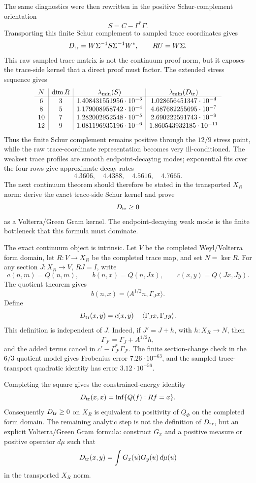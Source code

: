 \documentclass[11pt]{article}
\begin{document}
The same diagnostics were then rewritten in the positive Schur-complement
orientation
\[
  S=C-\Gamma^\ast\Gamma .
\]
Transporting this finite Schur complement to sampled trace coordinates gives
\[
  D_{\rm tr}=W\Sigma^{-1}S\Sigma^{-1}W^\ast,\qquad
  RU=W\Sigma .
\]
This raw sampled trace matrix is not the continuum proof norm, but it exposes
the trace-side kernel that a direct proof must factor.  The extended stress
sequence gives
\[
\begin{array}{c|c|c|c}
N&\dim R&\lambda_{\min}(S)&\lambda_{\min}(D_{\rm tr})\\
\hline
6&3&1.408431551956\cdot10^{-3}&1.028656451347\cdot10^{-4}\\
8&5&1.179008958742\cdot10^{-4}&4.687682255695\cdot10^{-7}\\
10&7&1.282002952548\cdot10^{-5}&2.690222591743\cdot10^{-9}\\
12&9&1.081196935196\cdot10^{-6}&1.860543932185\cdot10^{-11}
\end{array}
\]
Thus the finite Schur complement remains positive through the \(12/9\) stress
point, while the raw trace-coordinate representation becomes very
ill-conditioned.  The weakest trace profiles are smooth endpoint-decaying
modes; exponential fits over the four rows give approximate decay rates
\[
  4.3606,\quad 4.4388,\quad 4.5616,\quad 4.7665 .
\]
The next continuum theorem should therefore be stated in the transported
\(X_R\) norm: derive the exact trace-side Schur kernel and prove
\[
  D_{\rm tr}\ge0
\]
as a Volterra/Green Gram kernel.  The endpoint-decaying weak mode is the finite
bottleneck that this formula must dominate.

The exact continuum object is intrinsic.  Let \(V\) be the completed
Weyl/Volterra form domain, let \(R:V\to X_R\) be the completed trace map, and
set \(N=\ker R\).  For any section \(J:X_R\to V\), \(RJ=I\), write
\[
  a(n,m)=Q(n,m),\qquad b(n,x)=Q(n,Jx),\qquad c(x,y)=Q(Jx,Jy).
\]
The quotient theorem gives
\[
  b(n,x)=\langle A^{1/2}n,\Gamma_J x\rangle .
\]
Define
\[
  D_{\rm tr}(x,y)
  =
  c(x,y)-\langle \Gamma_Jx,\Gamma_Jy\rangle .
\]
This definition is independent of \(J\).  Indeed, if \(J'=J+h\), with
\(h:X_R\to N\), then
\[
  \Gamma_{J'}=\Gamma_J+A^{1/2}h,
\]
and the added terms cancel in \(c'-\Gamma_{J'}^\ast\Gamma_{J'}\).  The finite
section-change check in the \(6/3\) quotient model gives Frobenius error
\(7.26\cdot10^{-63}\), and the sampled trace-transport quadratic identity has
error \(3.12\cdot10^{-56}\).

Completing the square gives the constrained-energy identity
\[
  D_{\rm tr}(x,x)=\inf\{Q(f):Rf=x\}.
\]
Consequently \(D_{\rm tr}\ge0\) on \(X_R\) is equivalent to positivity of
\(Q_\Phi\) on the completed form domain.  The remaining analytic step is not
the definition of \(D_{\rm tr}\), but an explicit Volterra/Green Gram formula:
construct \(G_x\) and a positive measure or positive operator \(d\mu\) such that
\[
  D_{\rm tr}(x,y)=\int G_x(u)G_y(u)\,d\mu(u)
\]
in the transported \(X_R\) norm.
\end{document}
